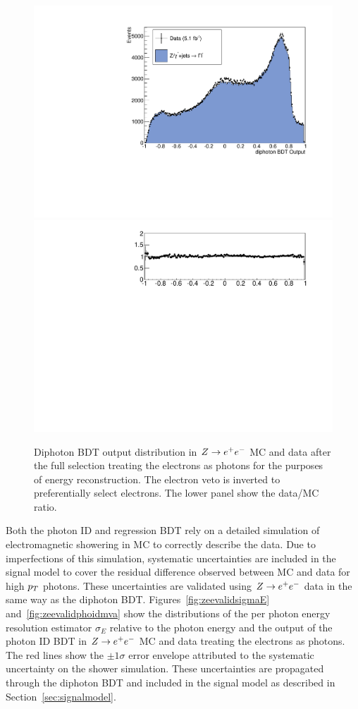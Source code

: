 \begin{figure}
  \includegraphics[width=.8\textwidth]{hgg7TeV/zeeValidation/zeevalidationdipho.pdf}\\
  \includegraphics[width=.8\textwidth]{hgg7TeV/zeeValidation/zeevalidationdipho_ratio.pdf}
\caption{Diphoton BDT output distribution in $Z\rightarrow e^{+}e^{-}$ MC and data after the full selection 
treating the electrons as photons for the purposes of energy reconstruction. The electron 
veto is inverted to preferentially select electrons. The lower panel show the data/MC ratio.}
\label{fig:zeevaliddiphomva}
\end{figure}

Both the photon ID and regression BDT rely on a detailed simulation of electromagnetic showering  
in MC to correctly describe the data. Due to imperfections of this simulation, systematic
uncertainties are included in the signal model to cover the residual difference observed between MC and data
for high $p_{T}$ photons. 
These uncertainties are validated using $Z\rightarrow e^{+}e^{-}$ data in the same way as the diphoton BDT. 
Figures~\ref{fig:zeevalidsigmaE} and~\ref{fig:zeevalidphoidmva} show the distributions of the 
per photon energy resolution estimator $\sigma_{E}$ relative to the photon energy and the output of the 
photon ID BDT in $Z\rightarrow e^{+}e^{-}$ MC and data treating the electrons as photons. The red lines
show the $\pm 1\sigma$ error envelope attributed to the systematic uncertainty on the shower simulation.  
These uncertainties are propagated through the diphoton BDT and included in the signal model as described in 
Section~\ref{sec:signalmodel}.

